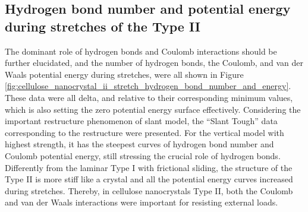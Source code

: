 \documentclass{article}
\begin{document}
\clearpage

\subsection*{Hydrogen bond number and potential energy during stretches of the Type II}\indent
{}\indent

The dominant role of hydrogen bonds and Coulomb interactions should be further elucidated, and the number of hydrogen bonds, the Coulomb, and van der Waals potential energy during stretches, were all shown in Figure \ref{fig:cellulose_nanocrystal_ii_stretch_hydrogen_bond_number_and_energy}.
These data were all delta, and relative to their corresponding minimum values, which is also setting the zero potential energy surface effectively.
Considering the important restructure phenomenon of slant model, the ``Slant Tough'' data corresponding to the restructure were presented.
For the vertical model with highest strength, it has the steepest curves of hydrogen bond number and Coulomb potential energy, still stressing the crucial role of hydrogen bonds.
Differently from the laminar Type I with frictional sliding, the structure of the Type II is more stiff like a crystal and all the potential energy curves increased during stretches.
Thereby, in cellulose nanocrystals Type II, both the Coulomb and van der Waals interactions were important for resisting external loads.
\end{document}
